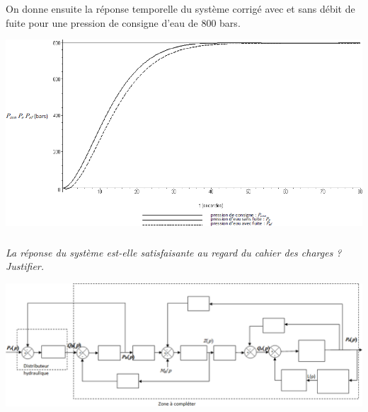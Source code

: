 \documentclass[10pt,fleqn]{article} %
\begin{document}
\begin{multicols}{2}
%
%
%
%
%
%
%
%
%
%

On donne ensuite la réponse temporelle du système corrigé avec et sans débit de fuite pour une pression de consigne d’eau de 800 bars.


\begin{center}
\includegraphics[width=\linewidth]{images_02/fig_09}
\end{center}

\subparagraph{}
\textit{La réponse du système est-elle satisfaisante au regard du cahier des charges ? Justifier.}


\end{multicols}


\begin{center}
\includegraphics[width=\linewidth]{images_02/fig_10}
\end{center}
\end{document}
